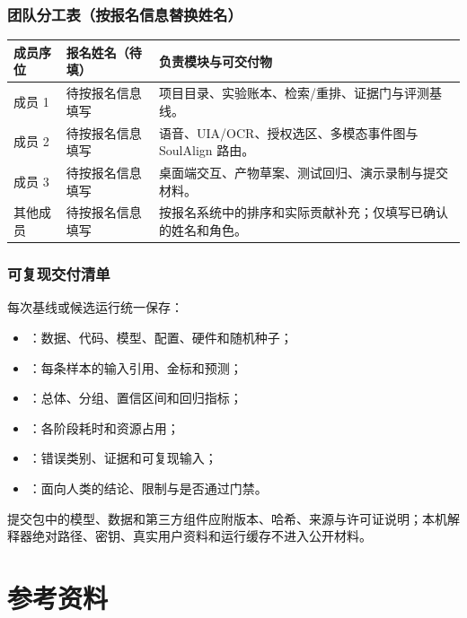 \documentclass[UTF8,12pt]{ctexart}
\begin{document}
\subsubsection{团队分工表（按报名信息替换姓名）}
\begin{center}
\small
\begin{tabularx}{\textwidth}{>{\centering\arraybackslash}p{}
  >{\raggedright\arraybackslash}p{}
  >{\raggedright\arraybackslash}X}
\toprule
成员序位 & 报名姓名（待填） & 负责模块与可交付物\\
\midrule
成员 1 & 待按报名信息填写 & 项目目录、实验账本、检索/重排、证据门与评测基线。\\
成员 2 & 待按报名信息填写 & 语音、UIA/OCR、授权选区、多模态事件图与 SoulAlign 路由。\\
成员 3 & 待按报名信息填写 & 桌面端交互、产物草案、测试回归、演示录制与提交材料。\\
其他成员 & 待按报名信息填写 & 按报名系统中的排序和实际贡献补充；仅填写已确认的姓名和角色。\\
\bottomrule
\end{tabularx}
\end{center}

\subsubsection{可复现交付清单}
每次基线或候选运行统一保存：
\begin{itemize}
  \item {}：数据、代码、模型、配置、硬件和随机种子；
  \item {}：每条样本的输入引用、金标和预测；
  \item {}：总体、分组、置信区间和回归指标；
  \item {}：各阶段耗时和资源占用；
  \item {}：错误类别、证据和可复现输入；
  \item {}：面向人类的结论、限制与是否通过门禁。
\end{itemize}
提交包中的模型、数据和第三方组件应附版本、哈希、来源与许可证说明；本机解释器绝对路径、密钥、真实用户资料和运行缓存不进入公开材料。

\section{参考资料}
\end{document}
